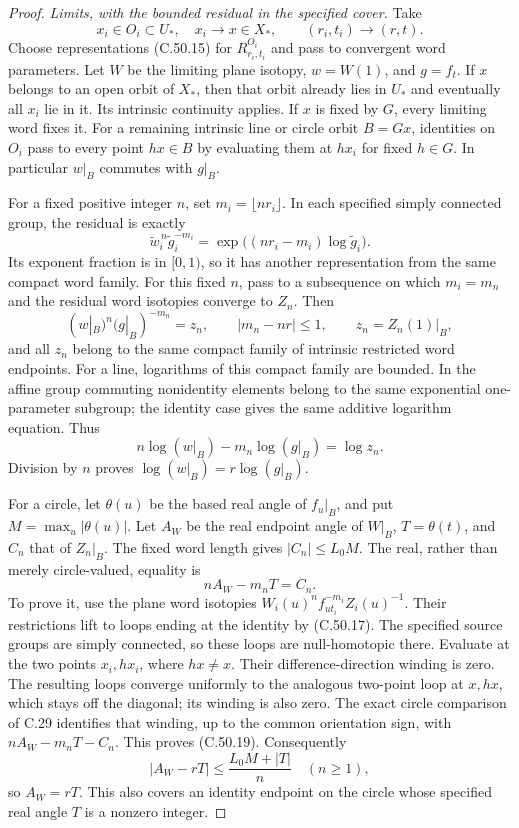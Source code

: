 \begin{proof}
\emph{Limits, with the bounded residual in the specified cover.}
Take
\[
 x_i\in O_i\subset U_*,\quad x_i\to x\in X_*,
       \qquad (r_i,t_i)\to(r,t).
                                                        \tag{C.50.16}
\]
Choose representations (C.50.15) for
$R^{O_i}_{r_i,t_i}$ and pass to convergent word parameters.
Let $W$ be the limiting plane isotopy, $w=W(1)$,
and $g=f_t$.
If $x$ belongs to an open orbit of $X_*$, then that
orbit already lies in $U_*$ and eventually all $x_i$
lie in it. Its intrinsic continuity applies.
If $x$ is fixed by $G$, every limiting word fixes it.
For a remaining intrinsic line or circle orbit $B=Gx$,
identities on $O_i$ pass to every point $hx\in B$
by evaluating them at $hx_i$ for fixed $h\in G$.
In particular $w|_B$ commutes with $g|_B$.

For a fixed positive integer $n$, set
$m_i=\lfloor nr_i\rfloor$. In each specified simply
connected group, the residual is exactly
\[
       \widetilde w_i^{\,n}\widetilde g_i^{-m_i}
           =\exp\bigl((nr_i-m_i)\log\widetilde g_i\bigr).
                                                        \tag{C.50.17}
\]
Its exponent fraction is in $[0,1)$, so it has another
representation from the same compact word family.
For this fixed $n$, pass to a subsequence on which
$m_i=m_n$ and the residual word isotopies converge
to $Z_n$. Then
\[
       (w|_B)^n(g|_B)^{-m_n}=z_n,\qquad
       |m_n-nr|\leq1,\qquad z_n=Z_n(1)|_B,              \tag{C.50.18}
\]
and all $z_n$ belong to the same compact family of
intrinsic restricted word endpoints.
For a line, logarithms of this compact family are bounded.
In the affine group commuting nonidentity elements belong
to the same exponential one-parameter subgroup; the
identity case gives the same additive logarithm equation.
Thus
\[
          n\log(w|_B)-m_n\log(g|_B)=\log z_n .
 \]
Division by $n$ proves
$\log(w|_B)=r\log(g|_B)$.

For a circle, let $\theta(u)$ be the based real angle
of $f_u|_B$, and put $M=\max_u|\theta(u)|$.
Let $A_W$ be the real endpoint angle of $W|_B$,
$T=\theta(t)$, and $C_n$ that of $Z_n|_B$.
The fixed word length gives $|C_n|\leq L_0M$.
The real, rather than merely circle-valued, equality is
\[
                         nA_W-m_nT=C_n.                \tag{C.50.19}
\]
To prove it, use the plane word isotopies
$W_i(u)^n f_{u t_i}^{-m_i}Z_i(u)^{-1}$.
Their restrictions lift to loops ending at the identity
by (C.50.17). The specified source groups are simply
connected, so these loops are null-homotopic there.
Evaluate at the two points $x_i,hx_i$, where $hx\ne x$.
Their difference-direction winding is zero.
The resulting loops converge uniformly to the analogous
two-point loop at $x,hx$, which stays off the diagonal;
its winding is also zero.
The exact circle comparison of C.29 identifies that
winding, up to the common orientation sign, with
$nA_W-m_nT-C_n$. This proves (C.50.19).
Consequently
\[
                  |A_W-rT|
                       \leq\frac{L_0M+|T|}{n}
                       \quad(n\geq1),
 \]
so $A_W=rT$.
This also covers an identity endpoint on the circle
whose specified real angle $T$ is a nonzero integer.


\end{proof}
